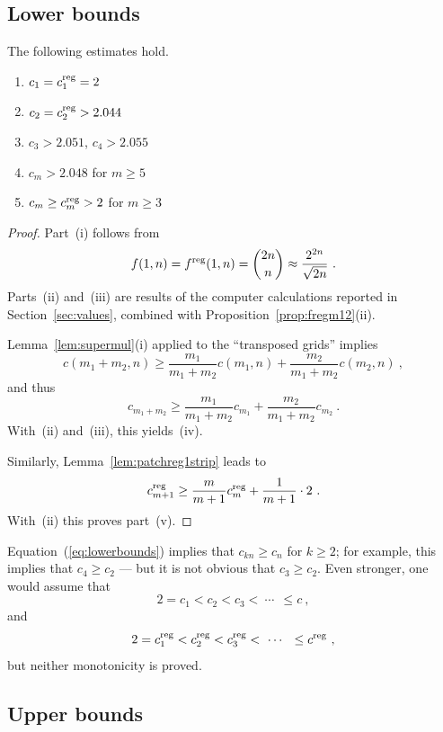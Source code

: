 \subsection{Lower bounds}\label{subsec:lower_bounds}


\begin{prop}
  The following estimates hold.
  \begin{enumerate}
    \item[\rm(i)] $c_1=c^{\mathrm{reg}}_1=2$
    \item[\rm(ii)] $c_2=c^{\mathrm{reg}}_2>2.044$
    \item[\rm(iii)] $c_3>2.051$, $c_4>2.055$
    \item[\rm(iv)] $c_m>2.048$ for $m\geq 5$
    \item[\rm(v)] $c_m\ge c^{\mathrm{reg}}_m>2$ for $m\geq 3$
  \end{enumerate}
\end{prop}

\begin{proof}
  Part~(i) follows from 
  $$
  f(1,n)=\freg(1,n)=\binom{2n}{n}\approx\frac{2^{2n}}{\sqrt{2n}}\ .
  $$
  Parts~(ii) and~(iii) are results of the computer calculations
  reported in Section~\ref{sec:values}, combined with
  Proposition~\ref{prop:fregm12}(ii).

  Lemma~\ref{lem:supermul}(i) applied to the ``transposed grids'' implies 
  \begin{equation}
    \label{eq:lowerbounds}
    c(m_1+m_2,n)\geq\frac{m_1}{m_1+m_2}c(m_1,n)+\frac{m_2}{m_1+m_2}c(m_2,n)\ ,    
  \end{equation}
  and thus 
  $$
  c_{m_1+m_2}\geq\frac{m_1}{m_1+m_2}c_{m_1}+\frac{m_2}{m_1+m_2}c_{m_2}\ .
  $$
  With~(ii) and~(iii), this yields~(iv).

  Similarly, Lemma~\ref{lem:patchreg1strip} leads to
  $$
  c^{\mathrm{reg}}_{m+1}\geq \frac{m}{m+1}c^{\mathrm{reg}}_m+\frac{1}{m+1}\cdot 2\ .
  $$
  With~(ii) this proves part~(v).
\end{proof}

Equation~(\ref{eq:lowerbounds}) implies that $c_{kn}\ge c_n$ for
$k\ge2$; for example, this implies that $c_4\ge c_2$ --- but it is not
obvious that $c_3\ge c_2$. Even stronger, one would assume that
\[
2 = c_1 <  c_2 <  c_3 < \ \cdots\ \ \le c\ ,
\]
and
\[
2 = c^{\mathrm{reg}}_1 <  c^{\mathrm{reg}}_2 <  c^{\mathrm{reg}}_3 < \ \cdots\ \ \le c^{\mathrm{reg}}\ ,
\]
but neither monotonicity is proved.


\subsection{Upper bounds}\label{subsec:upper_bounds}

